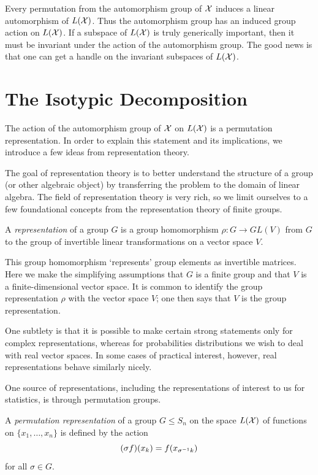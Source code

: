 \documentclass[cclicense]{hmcthesis}
\numberwithin{equation}{chapter}
\numberwithin{ucounter}{chapter}
\begin{document}
    Every permutation from the automorphism group of $\mathcal{X}$ induces a linear
    automorphism of $L(\mathcal{X})$.  Thus the automorphism group has an induced group
    action on $L(\mathcal{X})$.  If a subspace of $L(\mathcal{X})$ is truly generically
    important, then it must be invariant under the action of the automorphism
    group.  The good news is that one can get a handle on the invariant
    subspaces of $L(\mathcal{X})$.


\section{The Isotypic Decomposition}
    The action of the automorphism group of $\mathcal{X}$ on $L(\mathcal{X})$ is a permutation
    representation.  In order to explain this statement and its implications, we
    introduce a few ideas from representation theory.
    
    The goal of representation theory is to better understand the structure of a
    group (or other algebraic object) by transferring the problem to the domain
    of linear algebra.  The field of representation theory is very rich, so we
    limit ourselves to a few foundational concepts from the representation
    theory of finite groups.

    \begin{definition}
        A \emph{representation} of a group $G$ is a group homomorphism $\rho: G
        \to GL(V)$ from $G$ to the group of invertible linear transformations on
        a vector space $V$.  
    \end{definition}
    This group homomorphism `represents' group elements as invertible matrices.
    Here we make the simplifying assumptions that $G$ is a finite group and
    that $V$ is a finite-dimensional vector space.  It is common to identify the
    group representation $\rho$ with the vector space $V$; one then says that
    $V$ is the group representation.

    One subtlety is that it is possible to make certain strong statements only
    for complex representations, whereas for probabilities distributions we wish
    to deal with real vector spaces.  In some cases of practical interest,
    however, real representations behave similarly nicely.

    One source of representations, including the representations of interest to
    us for statistics, is through permutation groups.  
    \begin{definition}
        A \emph{permutation representation} of a group $G \le S_n$ on the space
        $L(\mathcal{X})$ of functions on $\{x_1, \ldots, x_n\}$ is defined by the action
        \[
            (\sigma f)(x_k) = f(x_{\sigma^{-1} k})
        \]
        for all $\sigma \in G$.
    \end{definition}
\end{document}
